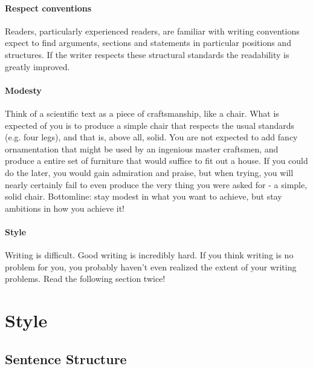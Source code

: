 \documentclass{tufte-book}
\begin{document}
\paragraph{Respect conventions} Readers, particularly experienced readers, are familiar with writing conventions expect to find arguments, sections and statements in particular positions and structures. If the writer respects these structural standards the readability is greatly improved. 


\paragraph{Modesty} Think of a scientific text as a piece of craftsmanship, like a chair. What is expected of you is to produce a simple chair that respects the usual standards (e.g. four legs), and that is, above all, solid. You are not expected to add fancy ornamentation that might be used by an ingenious master craftsmen, and produce a entire set of furniture that would suffice to fit out a house. If you could do the later, you would gain admiration and praise, but when trying, you will nearly certainly fail to even produce the very thing you were asked for - a simple, solid chair. Bottomline: stay modest in what you want to achieve, but stay ambitions in how you achieve it!


\paragraph{Style} Writing is difficult. Good writing is incredibly hard. If you think writing is no problem for you, you probably haven't even realized the extent of your writing problems. Read the following section twice!


\section{Style}


\subsection{Sentence Structure}
\end{document}
